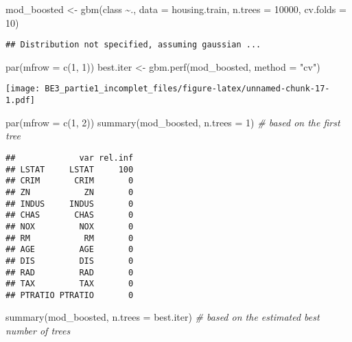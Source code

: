 \documentclass[
]{article}
\newenvironment{Shaded}{\begin{snugshade}}{\end{snugshade}}
\newcommand{\AttributeTok}[1]{\textcolor[rgb]{0.77,0.63,0.00}{#1}}
\newcommand{\CommentTok}[1]{\textcolor[rgb]{0.56,0.35,0.01}{\textit{#1}}}
\newcommand{\DecValTok}[1]{\textcolor[rgb]{0.00,0.00,0.81}{#1}}
\newcommand{\FunctionTok}[1]{\textcolor[rgb]{0.00,0.00,0.00}{#1}}
\newcommand{\NormalTok}[1]{#1}
\newcommand{\OtherTok}[1]{\textcolor[rgb]{0.56,0.35,0.01}{#1}}
\newcommand{\SpecialCharTok}[1]{\textcolor[rgb]{0.00,0.00,0.00}{#1}}
\newcommand{\StringTok}[1]{\textcolor[rgb]{0.31,0.60,0.02}{#1}}
\begin{document}
\begin{Shaded}
\begin{Highlighting}[]
\NormalTok{mod\_boosted }\OtherTok{\textless{}{-}} \FunctionTok{gbm}\NormalTok{(class }\SpecialCharTok{\textasciitilde{}}\NormalTok{., }\AttributeTok{data =}\NormalTok{ housing.train, }\AttributeTok{n.trees =} \DecValTok{10000}\NormalTok{, }\AttributeTok{cv.folds =} \DecValTok{10}\NormalTok{)}
\end{Highlighting}
\end{Shaded}

\begin{verbatim}
## Distribution not specified, assuming gaussian ...
\end{verbatim}

\begin{Shaded}
\begin{Highlighting}[]
\FunctionTok{par}\NormalTok{(}\AttributeTok{mfrow =} \FunctionTok{c}\NormalTok{(}\DecValTok{1}\NormalTok{, }\DecValTok{1}\NormalTok{))}
\NormalTok{best.iter }\OtherTok{\textless{}{-}} \FunctionTok{gbm.perf}\NormalTok{(mod\_boosted, }\AttributeTok{method =} \StringTok{"cv"}\NormalTok{)}
\end{Highlighting}
\end{Shaded}

\texttt{[image: BE3\_partie1\_incomplet\_files/figure-latex/unnamed-chunk-17-1.pdf]}

\begin{Shaded}
\begin{Highlighting}[]
\FunctionTok{par}\NormalTok{(}\AttributeTok{mfrow =} \FunctionTok{c}\NormalTok{(}\DecValTok{1}\NormalTok{, }\DecValTok{2}\NormalTok{))}
\FunctionTok{summary}\NormalTok{(mod\_boosted, }\AttributeTok{n.trees =} \DecValTok{1}\NormalTok{)          }\CommentTok{\# based on the first tree}
\end{Highlighting}
\end{Shaded}

\begin{verbatim}
##             var rel.inf
## LSTAT     LSTAT     100
## CRIM       CRIM       0
## ZN           ZN       0
## INDUS     INDUS       0
## CHAS       CHAS       0
## NOX         NOX       0
## RM           RM       0
## AGE         AGE       0
## DIS         DIS       0
## RAD         RAD       0
## TAX         TAX       0
## PTRATIO PTRATIO       0
\end{verbatim}

\begin{Shaded}
\begin{Highlighting}[]
\FunctionTok{summary}\NormalTok{(mod\_boosted, }\AttributeTok{n.trees =}\NormalTok{ best.iter)  }\CommentTok{\# based on the estimated best number of trees}
\end{Highlighting}
\end{Shaded}
\end{document}

